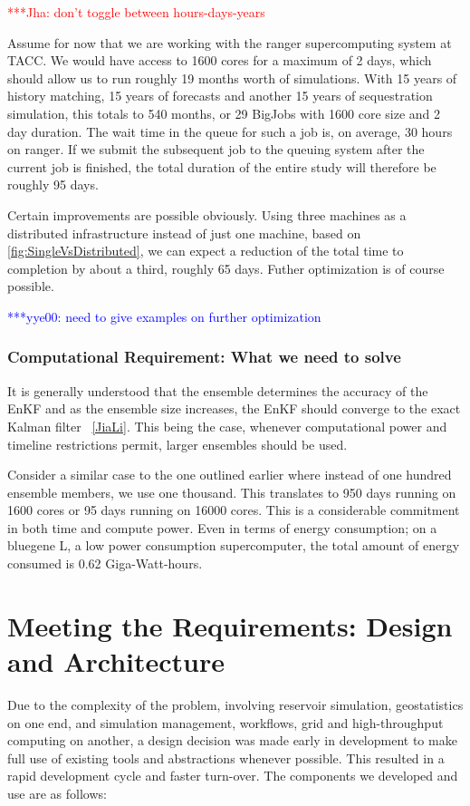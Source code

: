 \documentclass{rspublic}
\newcommand{\jhanote}[1]{ {\textcolor{red} { ***Jha: #1 }}}
\newcommand{\yyenote}[1]{ {\textcolor{blue} { ***yye00: #1 }}}
\newcommand{\jhanote}[1]{}
\newcommand{\yyenote}[1]{}
\begin{document}
\jhanote{don't toggle between hours-days-years}

Assume for now that we are working with the ranger supercomputing
system at TACC. We would have access to 1600 cores for a maximum of 2
days, which should allow us to run roughly 19 months worth of
simulations. With 15 years of history matching, 15 years of forecasts
and another 15 years of sequestration simulation, this totals to 540
months, or 29 BigJobs with 1600 core size and 2 day duration. The wait
time in the queue for such a job is, on average, 30 hours on
ranger. If we submit the subsequent job to the queuing system after
the current job is finished, the total duration of the entire study
will therefore be roughly 95 days.

Certain improvements are possible obviously. Using three machines as a
distributed infrastructure instead of just one machine, based on
\ref{fig:SingleVsDistributed}, we can expect a reduction of the total
time to completion by about a third, roughly 65 days. Futher
optimization is of course possible.

\yyenote{need to give examples on further optimization}	

\subsubsection{Computational Requirement: What we need to solve}
It is generally understood that the ensemble determines the accuracy of the
EnKF and as the ensemble size increases, the EnKF should converge to the exact
Kalman filter ~\ref{JiaLi}. This being the case, whenever computational power
and timeline restrictions permit, larger ensembles should be used.

Consider a similar case to the one outlined earlier where instead of
one hundred ensemble members, we use one thousand. This translates
to 950 days running on 1600 cores or 95 days running on 16000 cores.
This is a considerable commitment in both time and compute power. Even in terms
of energy consumption; on a bluegene L, a low power 
consumption supercomputer, the total amount of
energy consumed is 0.62 Giga-Watt-hours.

\section{Meeting the Requirements: Design and Architecture}

Due to the complexity of the problem, involving reservoir simulation,
geostatistics on one end, and simulation management, workflows, grid
and high-throughput computing on another, a design decision was made
early in development to make full use of existing tools and
abstractions whenever possible. This resulted in a rapid development
cycle and faster turn-over. The components we developed and use are as
follows:
\end{document}
